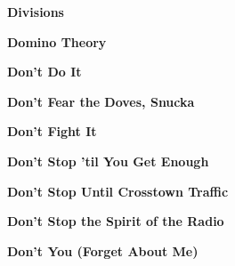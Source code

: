 \vspace{10pt} 
\begin{center}\textbf{Divisions}\end{center}
\newline
\vspace{10pt} 
\begin{center}\textbf{Domino Theory}\end{center}
\newline
\vspace{10pt} 
\begin{center}\textbf{Don't Do It}\end{center}
\newline
\vspace{10pt} 
\begin{center}\textbf{Don't Fear the Doves, Snucka}\end{center}
\newline
\vspace{10pt} 
\begin{center}\textbf{Don't Fight It}\end{center}
\newline
\vspace{10pt} 
\begin{center}\textbf{Don't Stop 'til You Get Enough}\end{center}
\newline
\vspace{10pt} 
\begin{center}\textbf{Don't Stop Until Crosstown Traffic}\end{center}
\newline
\vspace{10pt} 
\begin{center}\textbf{Don't Stop the Spirit of the Radio}\end{center}
\newline
\vspace{10pt} 
\begin{center}\textbf{Don't You (Forget About Me)}\end{center}
\newline
